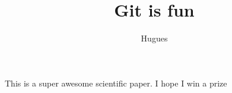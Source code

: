 \documentclass[10pt]{article}
\author{Hugues}
\title{Git is fun}
\begin{document}
	\maketitle

	This is a super awesome scientific paper.
	I hope I win a prize
\end{document}
